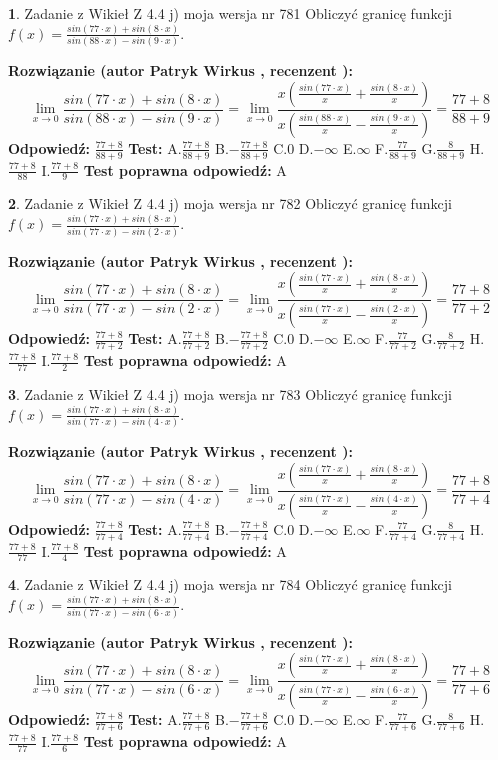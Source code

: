 \documentclass[12pt, a4paper]{article}
\theoremstyle{definition} %
\newtheorem{zad}{}
\newcommand{\zadStart}[1]{\begin{zad}#1\newline}
\newcommand{\zadStop}{\end{zad}}
\newcommand{\rozwStart}[2]{\noindent \textbf{Rozwiązanie (autor #1 , recenzent #2): }\newline}
\newcommand{\rozwStop}{\newline}
\newcommand{\odpStart}{\noindent \textbf{Odpowiedź:}\newline}
\newcommand{\odpStop}{\newline}
\newcommand{\testStart}{\noindent \textbf{Test:}\newline}
\newcommand{\testStop}{\newline}
\newcommand{\kluczStart}{\noindent \textbf{Test poprawna odpowiedź:}\newline}
\newcommand{\kluczStop}{\newline}
\begin{document}
\zadStart{Zadanie z Wikieł Z 4.4 j) moja wersja nr 781}
Obliczyć granicę funkcji $f(x)=\frac{sin(77\cdot x) +sin(8\cdot x)}{sin(88\cdot x) -sin(9\cdot x)}$.
\zadStop
\rozwStart{Patryk Wirkus}{}
$$\lim\limits_{x\to 0}\frac{sin(77\cdot x) +sin(8\cdot x)}{sin(88\cdot x) -sin(9\cdot x)}=\lim\limits_{x\to 0}\frac{x(\frac{sin(77\cdot x)}{x}+\frac{sin(8\cdot x)}{x})}{x(\frac{sin(88\cdot x)}{x}-\frac{sin(9\cdot x)}{x})}=\frac{77+8}{88+9}$$
\rozwStop
\odpStart
$\frac{77+8}{88+9}$
\odpStop
\testStart
A.$\frac{77+8}{88+9}$
B.$-\frac{77+8}{88+9}$
C.$0$
D.$-\infty$
E.$\infty$
F.$\frac{77}{88+9}$
G.$\frac{8}{88+9}$
H.$\frac{77+8}{88}$
I.$\frac{77+8}{9}$
\testStop
\kluczStart
A
\kluczStop



\zadStart{Zadanie z Wikieł Z 4.4 j) moja wersja nr 782}
Obliczyć granicę funkcji $f(x)=\frac{sin(77\cdot x) +sin(8\cdot x)}{sin(77\cdot x) -sin(2\cdot x)}$.
\zadStop
\rozwStart{Patryk Wirkus}{}
$$\lim\limits_{x\to 0}\frac{sin(77\cdot x) +sin(8\cdot x)}{sin(77\cdot x) -sin(2\cdot x)}=\lim\limits_{x\to 0}\frac{x(\frac{sin(77\cdot x)}{x}+\frac{sin(8\cdot x)}{x})}{x(\frac{sin(77\cdot x)}{x}-\frac{sin(2\cdot x)}{x})}=\frac{77+8}{77+2}$$
\rozwStop
\odpStart
$\frac{77+8}{77+2}$
\odpStop
\testStart
A.$\frac{77+8}{77+2}$
B.$-\frac{77+8}{77+2}$
C.$0$
D.$-\infty$
E.$\infty$
F.$\frac{77}{77+2}$
G.$\frac{8}{77+2}$
H.$\frac{77+8}{77}$
I.$\frac{77+8}{2}$
\testStop
\kluczStart
A
\kluczStop



\zadStart{Zadanie z Wikieł Z 4.4 j) moja wersja nr 783}
Obliczyć granicę funkcji $f(x)=\frac{sin(77\cdot x) +sin(8\cdot x)}{sin(77\cdot x) -sin(4\cdot x)}$.
\zadStop
\rozwStart{Patryk Wirkus}{}
$$\lim\limits_{x\to 0}\frac{sin(77\cdot x) +sin(8\cdot x)}{sin(77\cdot x) -sin(4\cdot x)}=\lim\limits_{x\to 0}\frac{x(\frac{sin(77\cdot x)}{x}+\frac{sin(8\cdot x)}{x})}{x(\frac{sin(77\cdot x)}{x}-\frac{sin(4\cdot x)}{x})}=\frac{77+8}{77+4}$$
\rozwStop
\odpStart
$\frac{77+8}{77+4}$
\odpStop
\testStart
A.$\frac{77+8}{77+4}$
B.$-\frac{77+8}{77+4}$
C.$0$
D.$-\infty$
E.$\infty$
F.$\frac{77}{77+4}$
G.$\frac{8}{77+4}$
H.$\frac{77+8}{77}$
I.$\frac{77+8}{4}$
\testStop
\kluczStart
A
\kluczStop



\zadStart{Zadanie z Wikieł Z 4.4 j) moja wersja nr 784}
Obliczyć granicę funkcji $f(x)=\frac{sin(77\cdot x) +sin(8\cdot x)}{sin(77\cdot x) -sin(6\cdot x)}$.
\zadStop
\rozwStart{Patryk Wirkus}{}
$$\lim\limits_{x\to 0}\frac{sin(77\cdot x) +sin(8\cdot x)}{sin(77\cdot x) -sin(6\cdot x)}=\lim\limits_{x\to 0}\frac{x(\frac{sin(77\cdot x)}{x}+\frac{sin(8\cdot x)}{x})}{x(\frac{sin(77\cdot x)}{x}-\frac{sin(6\cdot x)}{x})}=\frac{77+8}{77+6}$$
\rozwStop
\odpStart
$\frac{77+8}{77+6}$
\odpStop
\testStart
A.$\frac{77+8}{77+6}$
B.$-\frac{77+8}{77+6}$
C.$0$
D.$-\infty$
E.$\infty$
F.$\frac{77}{77+6}$
G.$\frac{8}{77+6}$
H.$\frac{77+8}{77}$
I.$\frac{77+8}{6}$
\testStop
\kluczStart
A
\kluczStop
\end{document}
